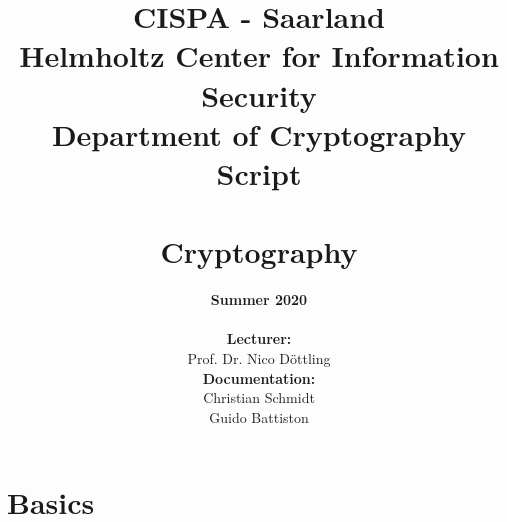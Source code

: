 \documentclass[10pt,fleqn]{report}
\begin{document}
\begin{titlepage}
\title{\vspace{-5cm}\small CISPA - Saarland\\
Helmholtz Center for Information Security \\
Department of Cryptography
\mbox{} \vspace{4cm}\\
\small\sansfont Script \\
\mbox{} \vspace{0.2cm}\\
  {\Huge\sansfont  Cryptography}\\}



\author{\scriptsize\sansfont\textbf{Summer 2020}\\
\vspace{1cm}\\
\textbf{\sansfont Lecturer:}\\
Prof. Dr. Nico Döttling
\vspace{1cm}\\
\textbf{\sansfont Documentation:}\\
Christian Schmidt \\
Guido Battiston
}
\date{}
\end{titlepage}
\maketitle


\iffalse
{\Huge Declaration}

\vspace{0.9cm}
\noindent I declare that I have developed and written the enclosed Bachelor Thesis completely by myself, and have not used sources or means without declaration in the text. Finally I thank ...
\fi 

\vspace{14.0cm}


\pagebreak
{\sansfont \small
\tableofcontents
}
\cleardoublepage
{}

{\sansfont
\Large

}


\part{Basics}





\end{document}
